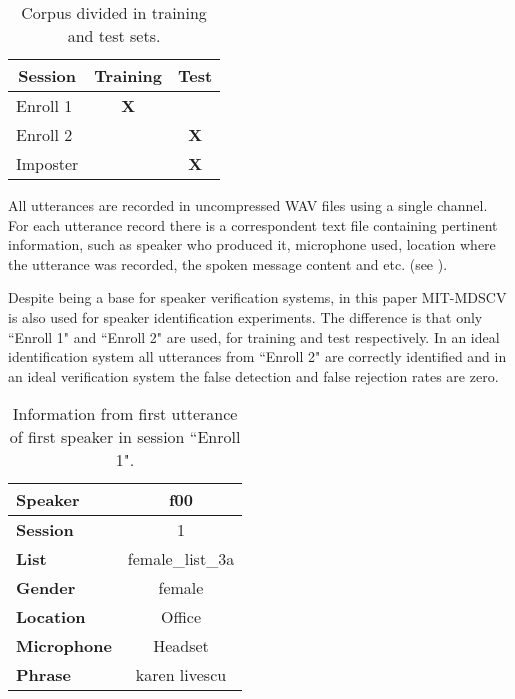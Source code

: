 \begin{table}[h]
    \centering
    \begin{tabular}{|l|c|c|}
    \hline
    \multicolumn{1}{|c|}{{\bf Session}} & {\bf Training} & {\bf Test} \\ \hline
    Enroll 1                            & {\bf X}        & {\bf }     \\ \hline
    Enroll 2                            & {\bf }         & {\bf X}    \\ \hline
    Imposter                            & {\bf }         & {\bf X}    \\ \hline
    \end{tabular}
    \caption{Corpus divided in training and test sets.}
    \label{tab:corpus-division}
\end{table}

All utterances are recorded in uncompressed WAV files using a single channel. For each utterance record there is a correspondent text file containing pertinent information, such as speaker who produced it, microphone used, location where the utterance was recorded, the spoken message content and etc. (see ).

Despite being a base for speaker verification systems, in this paper MIT-MDSCV is also used for speaker identification experiments. The difference is that only ``Enroll 1" and ``Enroll 2" are used, for training and test respectively. In an ideal identification system all utterances from ``Enroll 2" are correctly identified and in an ideal verification system the false detection and false rejection rates are zero.

\begin{table}[h]
    \centering
    \begin{tabular}{|l|c|}
    \hline
    {\bf Speaker}    & f00              \\ \hline
    {\bf Session}    & 1                \\ \hline
    {\bf List}       & female\_list\_3a \\ \hline
    {\bf Gender}     & female           \\ \hline
    {\bf Location}   & Office           \\ \hline
    {\bf Microphone} & Headset          \\ \hline
    {\bf Phrase}     & karen livescu    \\ \hline
    \end{tabular}
    \caption{Information from first utterance of first speaker in session ``Enroll 1".}
    \label{tab:utterance-info}
\end{table}

